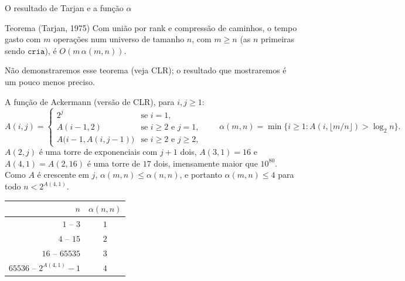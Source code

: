 \documentclass[aspectratio=169,10pt]{beamer}
\newcommand{\Cria}{\mathtt{cria}}
\begin{document}
\begin{frame}[t]{O resultado de Tarjan e a função $\alpha$}
  \small
  \begin{block}{Teorema (Tarjan, 1975)}
    Com união por rank e compressão de caminhos, o tempo gasto com $m$
    operações num universo de tamanho $n$, com $m\geq n$ (as $n$
    primeiras sendo $\Cria$), é $O(m\,\alpha(m,n))$.
  \end{block}
  Não demonstraremos esse teorema (veja CLR); o resultado que
  mostraremos é um pouco menos preciso.

  \medskip
  A função de Ackermann (versão de CLR), para $i,j\geq1$:
  \[
    A(i,j)=
    \begin{cases}
      2^j & \text{se } i=1,\\
      A(i-1,2) & \text{se } i\geq2 \text{ e } j=1,\\
      A\big(i-1,A(i,j-1)\big) & \text{se } i\geq2 \text{ e } j\geq2,
    \end{cases}
    \qquad
    \alpha(m,n)=\min\big\{i\geq1\colon A(i,\lfloor m/n\rfloor)>\log_2n\big\}.
  \]
  \footnotesize
  $A(2,j)$ é uma torre de exponenciais com $j+1$ dois, $A(3,1)=16$ e
  $A(4,1)=A(2,16)$ é uma torre de $17$ dois, imensamente maior que
  $10^{80}$.  Como $A$ é crescente em $j$, $\alpha(m,n)\leq\alpha(n,n)$,
  e portanto $\alpha(m,n)\leq4$ para todo $n<2^{A(4,1)}$.

  \centering
  \begin{tabular}{|r|c|}\hline
    $n$ & $\alpha(n,n)$ \\ \hline\hline
    $1$ -- $3$ & $1$ \\ \hline
    $4$ -- $15$ & $2$ \\ \hline
    $16$ -- $65535$ & $3$ \\ \hline
    $65536$ -- $2^{A(4,1)}-1$ & $4$ \\ \hline
  \end{tabular}
\end{frame}
\end{document}
